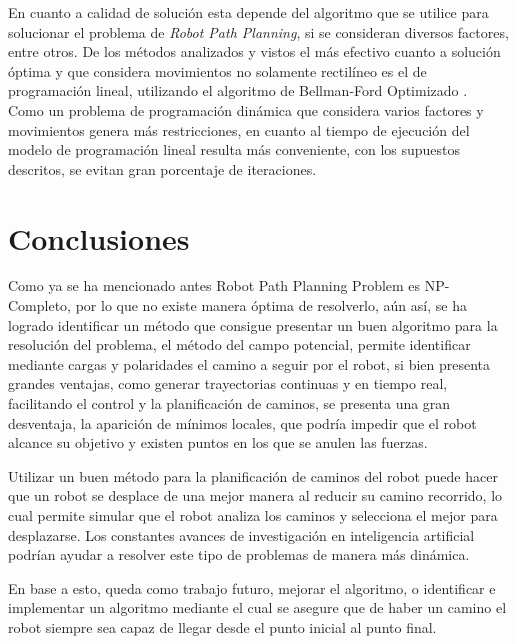 \documentclass[journal, 10pt]{IEEEtran}
\begin{document}
En cuanto a calidad de solución esta depende del algoritmo que se utilice para solucionar el problema de \textit{Robot Path Planning}, si se consideran diversos factores, entre otros. De los métodos analizados y vistos el más efectivo cuanto a solución óptima y que considera movimientos no solamente rectilíneo es el de programación lineal, utilizando el algoritmo de Bellman-Ford Optimizado \cite{PlanificacionPD:2011}.\\
Como un problema de programación dinámica que considera varios factores y movimientos genera más restricciones, en cuanto al tiempo de ejecución del modelo de programación lineal resulta más conveniente, con los supuestos descritos, se evitan gran porcentaje de iteraciones. 


\section{Conclusiones}

Como ya se ha mencionado antes Robot Path Planning Problem es NP-Completo, por lo que no existe manera óptima de resolverlo, aún así, se ha logrado identificar un método que consigue presentar un buen algoritmo para la resolución del problema, el método del campo potencial, permite identificar mediante cargas y polaridades el camino a seguir por el robot, si bien presenta grandes ventajas, como generar trayectorias continuas y en tiempo real, facilitando el control y la planificación de caminos, se presenta una gran desventaja, la aparición de mínimos locales, que podría impedir que el robot alcance su objetivo y existen puntos en los que se anulen las fuerzas.

Utilizar un buen método para la planificación de caminos del robot puede hacer que un robot se desplace de una mejor manera al reducir su camino recorrido, lo cual permite simular que el robot analiza los caminos y selecciona el mejor para desplazarse. Los constantes avances de investigación en inteligencia artificial podrían ayudar a resolver este tipo de problemas de manera más dinámica.

En base a esto, queda como trabajo futuro, mejorar el algoritmo, o identificar e implementar un algoritmo mediante el cual se asegure que de haber un camino el robot siempre sea capaz de llegar desde el punto inicial al punto final.




\end{document}
